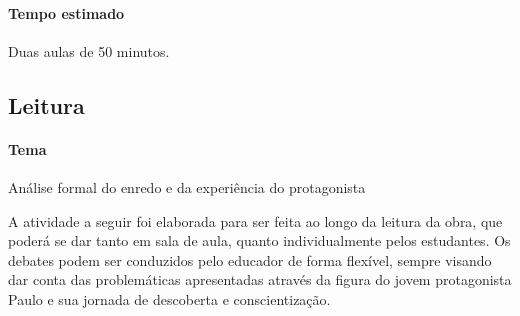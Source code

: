 \documentclass{extrarticle}
\begin{document}
\paragraph{Tempo estimado} Duas aulas de 50 minutos.

\subsection{Leitura}


\paragraph{Tema} Análise formal do enredo e da experiência do protagonista
  
A atividade a seguir foi elaborada para ser feita ao longo da leitura
da obra, que poderá se dar tanto em sala de aula, quanto
individualmente pelos estudantes. Os debates podem ser conduzidos pelo
educador de forma flexível, sempre visando dar conta das problemáticas
apresentadas através da figura do jovem protagonista Paulo e sua
jornada de descoberta e conscientização.
\end{document}
